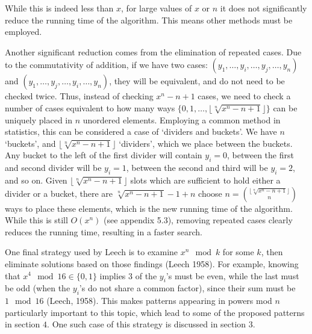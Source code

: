 \documentclass{article}
\begin{document}
\begin{flushleft}
\vspace{.1in}

While this is indeed less than $x$, for large values of $x$ or $n$ it does not significantly reduce the running time of the algorithm. This means other methods must be employed.

\vspace{.1in}

Another significant reduction comes from the elimination of repeated cases. Due to the commutativity of addition, if we have two cases: $(y_1, \ldots, y_i, \ldots, y_j, \ldots, y_n)$ and $(y_1, \ldots, y_j, \ldots, y_i, \ldots, y_n)$, they will be equivalent, and do not need to be checked twice. Thus, instead of checking $x^n - n + 1$ cases, we need to check a number of cases equivalent to how many ways $\{0, 1, \ldots, \lfloor\sqrt[n]{x^n - n + 1}\rfloor\}$ can be uniquely placed in $n$ unordered elements. Employing a common method in statistics, this can be considered a case of `dividers and buckets'. We have $n$ `buckets', and $\lfloor\sqrt[n]{x^n - n + 1}\rfloor$ `dividers', which we place between the buckets. Any bucket to the left of the first divider will contain $y_i = 0$, between the first and second divider will be $y_i = 1$, between the second and third will be $y_i = 2$, and so on. Given $\lfloor\sqrt[n]{x^n - n + 1}\rfloor$ slots which are sufficient to hold either a divider or a bucket, there are $\sqrt[n]{x^n - n + 1} - 1 + n$ choose $n = {\lfloor\sqrt[n]{x^n - n + 1}\rfloor \choose n}$ ways to place these elements, which is the new running time of the algorithm. While this is still $O(x^n)$ (see appendix 5.3), removing repeated cases clearly reduces the running time, resulting in a faster search.

\vspace{.1in}

One final strategy used by Leech is to examine $x^n \mod k$ for some $k$, then eliminate solutions based on those findings (Leech 1958). For example, knowing that $x^4 \mod 16 \in \{0, 1\}$ implies $3$ of the $y_i$'s must be even, while the last must be odd (when the $y_i$'s do not share a common factor), since their sum must be $1 \mod 16$ (Leech, 1958). This makes patterns appearing in powers mod $n$ particularly important to this topic, which lead to some of the proposed patterns in section $4$. One such case of this strategy is discussed in section $3$.

\vspace{.1in}


\end{flushleft}
\end{document}
